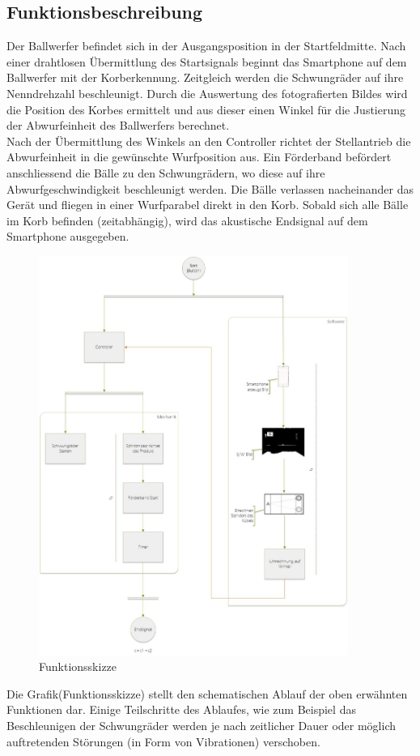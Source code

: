 \subsection{Funktionsbeschreibung}
Der Ballwerfer befindet sich in der Ausgangsposition in der Startfeldmitte. Nach einer drahtlosen Übermittlung des Startsignals beginnt das Smartphone auf dem Ballwerfer mit der Korberkennung. Zeitgleich werden die Schwungräder auf ihre Nenndrehzahl beschleunigt. Durch die Auswertung des fotografierten Bildes wird die Position des Korbes ermittelt und aus dieser einen Winkel für die Justierung der Abwurfeinheit des Ballwerfers berechnet.\\
Nach der Übermittlung des Winkels an den Controller richtet der Stellantrieb die Abwurfeinheit in die gewünschte Wurfposition aus. Ein Förderband befördert anschliessend die Bälle zu den Schwungrädern, wo diese auf ihre Abwurfgeschwindigkeit beschleunigt werden. Die Bälle verlassen nacheinander das Gerät und fliegen in einer Wurfparabel direkt in den Korb. Sobald sich alle Bälle im Korb befinden (zeitabhängig), wird das akustische Endsignal auf dem Smartphone ausgegeben.
\begin{figure}[h!]
	\centering
	\includegraphics[width=0.9\textwidth]{Enddokumentation/Loesungskonzept/Bilder/FlowOnChart_v2.jpg}
	\caption{Funktionsskizze}
	\label{fig:FlowChart}
\end{figure}
Die Grafik(Funktionsskizze) stellt den schematischen Ablauf der oben erwähnten Funktionen dar. Einige Teilschritte des Ablaufes, wie zum Beispiel das Beschleunigen der Schwungräder werden je nach zeitlicher Dauer oder möglich auftretenden Störungen (in Form von Vibrationen) verschoben.